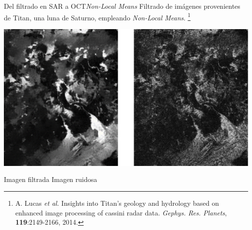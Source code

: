 \documentclass[fleqn,10pt]{beamer}
\newcommand\blfootnote[1]{%
	\begingroup
	\renewcommand\thefootnote{}\footnote{#1}%
	\addtocounter{footnote}{-1}%
	\endgroup
}
\begin{document}
\begin{frame}{Del filtrado en SAR a OCT}{\emph{Non-Local Means}}
	Filtrado de imágenes provenientes de Titan, una luna de Saturno, empleando \emph{Non-Local Means}.\blfootnote{{\tiny A. Lucas \emph{et al.} Insights into Titan's geology and hydrology based on enhanced image processing of cassini radar data. \emph{Gephys. Res. Planets}, \textbf{119}:2149-2166, 2014.}}
	\begin{center}
		\includegraphics[width=0.9\linewidth]{AAUgraphics/pt3/Titan_speckle}
	\end{center}
	\hspace*{1cm}Imagen filtrada \hspace*{3cm} Imagen ruidosa
\end{frame}
\end{document}
